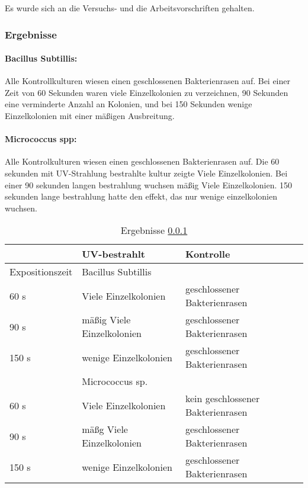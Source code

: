 Es wurde sich an die Versuchs- und die Arbeitsvorschriften gehalten.

\subsubsection{Ergebnisse}
\label{sec:Exp-UV-E}

\paragraph*{Bacillus Subtillis:}
Alle Kontrollkulturen wiesen einen geschlossenen Bakterienrasen auf.
Bei einer Zeit von 60 Sekunden waren viele Einzelkolonien zu verzeichnen, 90 Sekunden eine verminderte Anzahl an Kolonien, und bei 150 Sekunden wenige Einzelkolonien mit einer mäßigen Ausbreitung.

\paragraph*{Micrococcus spp:}
Alle Kontrolkulturen wiesen einen geschlossenen Bakterienrasen auf.
Die 60 sekunden mit UV-Strahlung bestrahlte kultur zeigte Viele Einzelkolonien.
Bei einer 90 sekunden langen bestrahlung wuchsen mäßig Viele Einzelkolonien.
150 sekunden lange bestrahlung hatte den effekt, das nur wenige einzelkolonien wuchsen.
\begin{table}[bp]
\centering
\caption{Ergebnisse \ref{sec:Exp-UV-E}}
\label{tab:Exp-UV-E}
\begin{tabular}{lll}
 & UV-bestrahlt & Kontrolle \\ \hline
Expositionszeit & \multicolumn{2}{l}{Bacillus Subtillis} \\ \cline{2-3} 
60 s & Viele Einzelkolonien & geschlossener Bakterienrasen \\
90 s & mäßig Viele Einzelkolonien & geschlossener Bakterienrasen \\
150 s & wenige Einzelkolonien & geschlossener Bakterienrasen \\ \hline
 & \multicolumn{2}{l}{Micrococcus sp.} \\ \cline{2-3} 
60 s & Viele  Einzelkolonien & kein geschlossener Bakterienrasen \\
90 s & mäßg Viele Einzelkolonien & geschlossener Bakterienrasen \\
150 s & wenige Einzelkolonien & geschlossener Bakterienrasen \\ \hline
\end{tabular}
\end{table}
%

